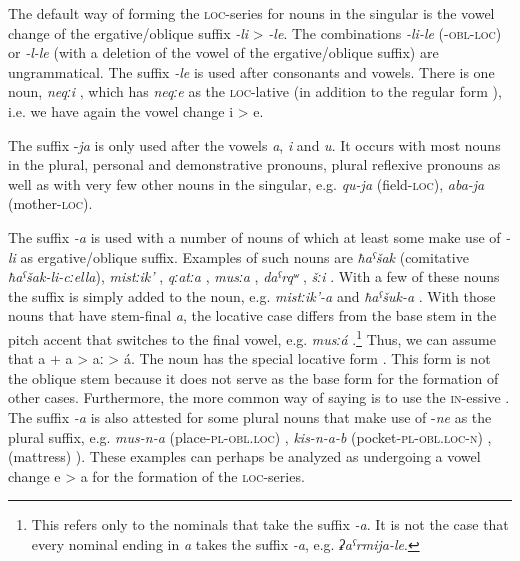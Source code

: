 The default way of forming the \textsc{loc}-series for nouns in the singular is the vowel change of the ergative\slash oblique suffix \textit{-li} > \textit{-le}. The combinations \textit{-li-le} (\textsc{-obl-loc}) or \textit{-l-le} (with a deletion of the vowel of the  ergative\slash oblique suffix) are ungrammatical. The suffix \textit{-le} is used after consonants and vowels. There is one noun, \textit{neqːi} , which has \textit{neqːe} as the \textsc{loc}-lative (in addition to the regular form ), i.e. we have again the vowel change i > e. 

The suffix -\textit{ja} is only used after the vowels \textit{a}, \textit{i} and \textit{u}. It occurs with most nouns in the plural, personal and demonstrative pronouns, plural reflexive pronouns as well as with very few other nouns in the singular, e.g. \textit{qu-ja} (field-\textsc{loc}), \textit{aba-ja} (mother-\textsc{loc}). 

The suffix \textit{-a} is used with a number of nouns of which at least some make use of \textit{-li} as ergative\slash oblique suffix. Examples of such nouns are \textit{ħaˁšak}   (comitative \textit{ħaˁšak-li-cːella}), \textit{mistːik'} , \textit{qːatːa} , \textit{musːa} , \textit{daˁrqʷ} , \textit{šːi} . With a few of these nouns the suffix is simply added to the noun, e.g. \textit{mistːik'-a}  and \textit{ħaˁšuk-a} . With those nouns that have stem-final \textit{a}, the locative case differs from the base stem in the pitch accent that switches to the final vowel, e.g. \textit{musːá}  .\footnote{This refers only to the nominals that take the suffix \textit{-a}. It is not the case that every nominal ending in \textit{a} takes the suffix \textit{-a}, e.g. \textit{ʡaˁrmija-le}.} Thus, we can assume that a + a > aː > á. The noun  has the special locative form  . This form is not the oblique stem because it does not serve as the base form for the formation of other cases. Furthermore, the more common way of saying  is to use the \textsc{in}-essive . The suffix \textit{-a} is also attested for some plural nouns that make use of -\textit{ne} as the plural suffix, e.g. \textit{mus-n-a} (place-\textsc{pl}-\textsc{obl}.\textsc{loc}) , \textit{kis-n-a-b} (pocket-\textsc{pl}-\textsc{obl}.\textsc{loc}-\textsc{n}) ,  (mattress) ). These examples can perhaps be analyzed as undergoing a vowel change e > a for the formation of the \textsc{loc}-series.

